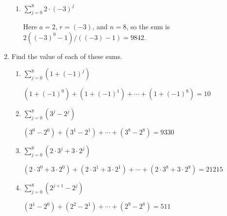 \documentclass[11pt]{article}
\begin{document}
\begin{enumerate}[label=\textbf{\arabic*.}]
\begin{enumerate}[label=\textbf{\alph*)}]
		\item $\sum_{j = 0}^{8} 2 \cdot (-3)^j$
		
		Here $a = 2$, $r = (-3)$, and $n = 8$, so the sum is $2((-3)^9 - 1) / ((-3) - 1) = 9842$.
	\end{enumerate}

	\item Find the value of each of these sums.
	
	\begin{enumerate}[label=\textbf{\alph*)}]
		\item $\sum_{j = 0}^{8} (1 + (-1)^j)$
		
		$(1 + (-1)^0) + (1 + (-1)^1) + \cdots + (1 + (-1)^8) = 10$
		
		\item $\sum_{j = 0}^{8} (3^j - 2^j)$
		
		$(3^0 - 2^0) + (3^1 - 2^1) + \cdots + (3^8 - 2^8) = 9330$
		
		\item $\sum_{j = 0}^{8} (2 \cdot 3^j + 3 \cdot 2^j)$
		
		$(2 \cdot 3^0 + 3 \cdot 2^0) + (2 \cdot 3^1 + 3 \cdot 2^1) + \cdots + (2 \cdot 3^8 + 3 \cdot 2^8) = 21215$
		
		\item $\sum_{j = 0}^{8} (2^{j + 1} - 2^j)$
		
		$(2^1 - 2^0) + (2^2 - 2^1) + \cdots + (2^9 - 2^8) = 511$
	\end{enumerate}
\end{enumerate}
\end{document}
